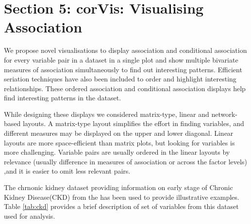 \hypertarget{section-5-corvis-visualising-association}{%
\section{Section 5: corVis: Visualising
Association}\label{section-5-corvis-visualising-association}}

We propose novel visualisations to display association and conditional
association for every variable pair in a dataset in a single plot and
show multiple bivariate measures of association simultaneously to find
out interesting patterns. Efficient seriation techniques have also been
included to order and highlight interesting relationships. These ordered
association and conditional association displays help find interesting
patterns in the dataset.

While designing these displays we considered matrix-type, linear and
network-based layouts. A matrix-type layout simplifies the effort in
finding variables, and different measures may be displayed on the upper
and lower diagonal. Linear layouts are more space-efficient than matrix
plots, but looking for variables is more challenging. Variable pairs are
usually ordered in the linear layouts by relevance (usually difference
in measures of association or across the factor levels) ,and it is
easier to omit less relevant pairs.

The chrnonic kidney dataset providing information on early stage of
Chronic Kidney Disease(CKD) from the \citep{Dua:2019} has been used to
provide illustrative examples. Table \ref{tab:ckd} provides a brief
description of set of variables from this dataset used for analysis.

